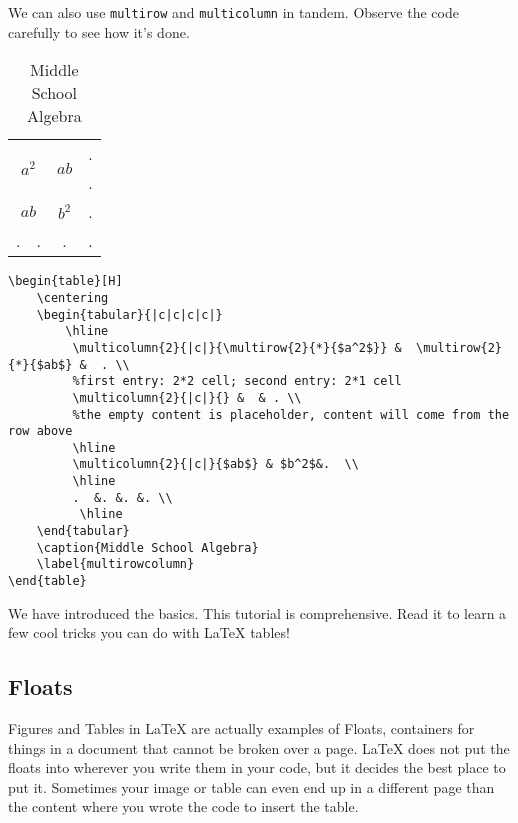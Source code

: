 \documentclass[12pt, letterpaper]{article}
\theoremstyle{remark}
\begin{document}
We can also use \verb!multirow! and \verb!multicolumn! in tandem. Observe the code carefully to see how it's done.
\begin{table}[H]
    \centering
    \begin{tabular}{|c|c|c|c|}
        \hline
         \multicolumn{2}{|c|}{\multirow{2}{*}{$a^2$}} &  \multirow{2}{*}{$ab$} &  . \\ 
         \multicolumn{2}{|c|}{} &  & . \\ 
         \hline 
         \multicolumn{2}{|c|}{$ab$} & $b^2$&.  \\
         \hline
         .  &. &. &. \\
          \hline
    \end{tabular}
    \caption{Middle School Algebra}
    \label{multirowcolumn}
\end{table}

\begin{lstlisting}
\begin{table}[H]
    \centering
    \begin{tabular}{|c|c|c|c|}
        \hline
         \multicolumn{2}{|c|}{\multirow{2}{*}{$a^2$}} &  \multirow{2}{*}{$ab$} &  . \\ 
         %first entry: 2*2 cell; second entry: 2*1 cell
         \multicolumn{2}{|c|}{} &  & . \\ 
         %the empty content is placeholder, content will come from the row above
         \hline 
         \multicolumn{2}{|c|}{$ab$} & $b^2$&.  \\
         \hline
         .  &. &. &. \\
          \hline
    \end{tabular}
    \caption{Middle School Algebra}
    \label{multirowcolumn}
\end{table}
\end{lstlisting}

We have introduced the basics. This tutorial \cite[Chapter 9]{figtable} is comprehensive. Read it to learn a few cool tricks you can do with \LaTeX{} tables!
\subsection{Floats}
Figures and Tables in \LaTeX{} are actually examples of Floats, containers for things in a document that cannot be broken over a page. \LaTeX{} does not put the floats into wherever you write them in your code, but it decides the best place to put it. Sometimes your image or table can even end up in a different page than the content where you wrote the code to insert the table.
\end{document}
